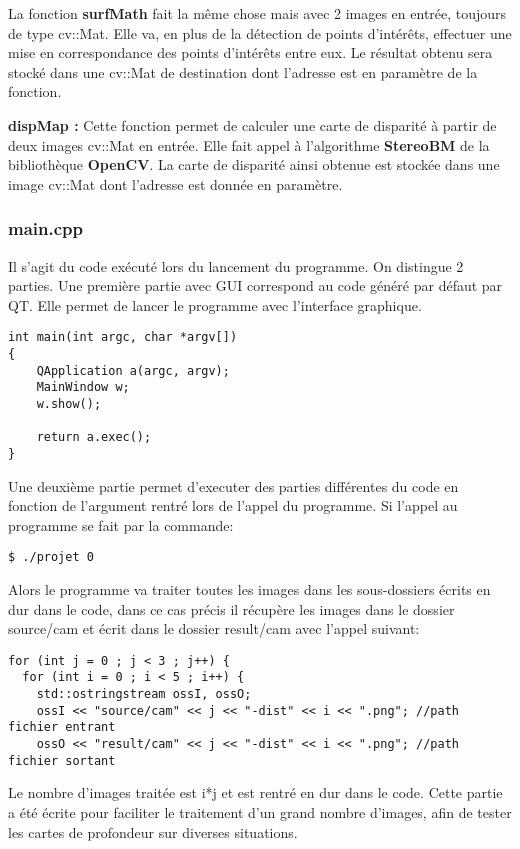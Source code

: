 \documentclass[a4paper]{article}
\begin{document}
La fonction \textbf{surfMath} fait la même chose mais avec 2 images en entrée,
toujours de type cv::Mat. Elle va, en plus de la détection de points d'intérêts,
effectuer une mise en correspondance des points d'intérêts entre eux. Le résultat
obtenu sera stocké dans une cv::Mat de destination dont l'adresse est en paramètre
de la fonction.


\textbf{dispMap :} Cette fonction permet de calculer une carte de disparité à
partir de deux images cv::Mat en entrée. Elle fait appel à l'algorithme
\textbf{StereoBM} de la bibliothèque \textbf{OpenCV}. La carte de disparité ainsi
obtenue est stockée dans une image cv::Mat dont l'adresse est donnée en paramètre.

\subsubsection*{main.cpp}

Il s'agit du code exécuté lors du lancement du programme. On distingue 2 parties.
Une première partie avec GUI correspond au code généré par défaut par QT.
Elle permet de lancer le programme avec l'interface graphique.

\begin{verbatim}
int main(int argc, char *argv[])
{
	QApplication a(argc, argv);
	MainWindow w;
	w.show();

	return a.exec();
}
\end{verbatim}

Une deuxième partie permet d'executer des parties différentes du code en fonction de l'argument rentré lors de l'appel du programme. Si l'appel au programme se fait par la commande:
\begin{verbatim}
$ ./projet 0
\end{verbatim}
Alors le programme va traiter toutes les images dans les sous-dossiers écrits en dur dans le code, dans ce cas précis il récupère les images dans le dossier source/cam et écrit dans le dossier result/cam avec l'appel suivant:
\begin{verbatim}
for (int j = 0 ; j < 3 ; j++) {
  for (int i = 0 ; i < 5 ; i++) {
    std::ostringstream ossI, ossO;
    ossI << "source/cam" << j << "-dist" << i << ".png"; //path fichier entrant
    ossO << "result/cam" << j << "-dist" << i << ".png"; //path fichier sortant
\end{verbatim}
Le nombre d'images traitée est i*j et est rentré en dur dans le code. Cette partie a été écrite pour faciliter le traitement d'un grand nombre d'images, afin de tester les cartes de profondeur sur diverses situations.
\end{document}
